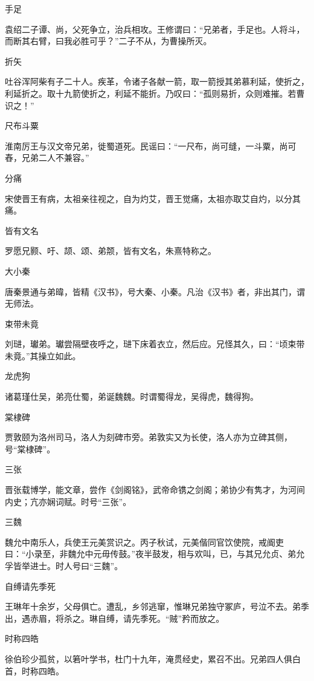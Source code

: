 \documentclass[a4paper,12pt,UTF8,twoside]{ctexbook}
\begin{document}
    手足
    
    袁绍二子谭、尚，父死争立，治兵相攻。王修谓曰：“兄弟者，手足也。人将斗，而断其右臂，曰我必胜可乎？”二子不从，为曹操所灭。
    
    折矢
    
    吐谷浑阿柴有子二十人。疾革，令诸子各献一箭，取一箭授其弟慕利延，使折之，利延折之。取十九箭使折之，利延不能折。乃叹曰：“孤则易折，众则难摧。若曹识之！”
    
    尺布斗粟
    
    淮南厉王与汉文帝兄弟，徙蜀道死。民谣曰：“一尺布，尚可缝，一斗粟，尚可舂，兄弟二人不兼容。”
    
    分痛
    
    宋使晋王有病，太祖亲往视之，自为灼艾，晋王觉痛，太祖亦取艾自灼，以分其痛。
    
    皆有文名
    
    罗愿兄颢、吁、颉、颂、弟颒，皆有文名，朱熹特称之。
    
    大小秦
    
    唐秦景通与弟暐，皆精《汉书》，号大秦、小秦。凡治《汉书》者，非出其门，谓无师法。
    
    束带未竟
    
    刘琎，瓛弟。瓛尝隔壁夜呼之，琎下床着衣立，然后应。兄怪其久，曰：“顷束带未竟。”其操立如此。
    
    龙虎狗
    
    诸葛瑾仕吴，弟亮仕蜀，弟诞魏魏。时谓蜀得龙，吴得虎，魏得狗。
    
    棠棣碑
    
    贾敦颐为洛州司马，洛人为刻碑市旁。弟敦实又为长使，洛人亦为立碑其侧，号“棠棣碑”。
    
    三张
    
    晋张载博学，能文章，尝作《剑阁铭》，武帝命镌之剑阁；弟协少有隽才，为河间内史；亢亦娴词赋。时号“三张”。
    
    三魏
    
    魏允中南乐人，兵使王元美赏识之。丙子秋试，元美偕同官饮使院，戒阍吏曰：“小录至，非魏允中元毋传鼓。”夜半鼓发，相与欢叫，已，与其兄允贞、弟允孚皆举进士。时人号曰“三魏”。
    
    自缚请先季死
    
    王琳年十余岁，父母俱亡。遭乱，乡邻逃窜，惟琳兄弟独守冢庐，号泣不去。弟季出，遇赤眉，将杀之。琳自缚，请先季死。“贼”矜而放之。
    
    时称四皓
    
    徐伯珍少孤贫，以箬叶学书，杜门十九年，淹贯经史，累召不出。兄弟四人俱白首，时称四皓。
    
\end{document}
